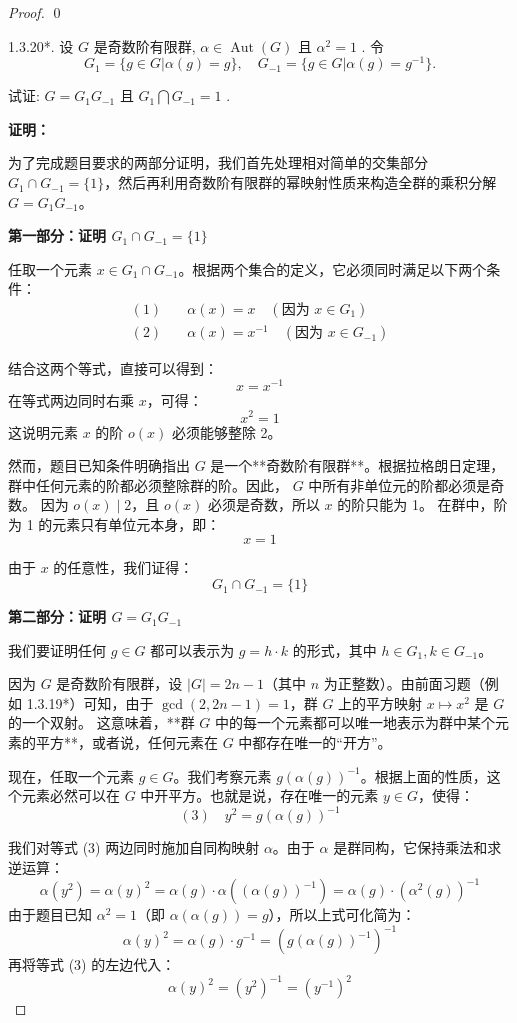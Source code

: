 \documentclass[]{article}
\begin{document}
\begin{proof}
\qed

1.3.20*. 设 $G$ 是奇数阶有限群, $\alpha \in \operatorname{Aut}(G)$ 且 $\alpha^2 = 1$ . 令 	$$
G _ {1} = \{g \in G | \alpha (g) = g \}, \quad G _ {- 1} = \{g \in G | \alpha (g) = g ^ {- 1} \}.
$$

试证: $G = G_{1}G_{-1}$ 且 $G_{1} \bigcap G_{-1} = 1$ . 

\bigskip
\noindent \textbf{证明：} 

为了完成题目要求的两部分证明，我们首先处理相对简单的交集部分 $G_{1} \cap  G_{-1} = \{1\}$，然后再利用奇数阶有限群的幂映射性质来构造全群的乘积分解 $G = G_{1}G_{-1}$。

\bigskip
\noindent \textbf{第一部分：证明 $G_{1} \cap  G_{-1} = \{1\}$}

任取一个元素 $x \in G_{1} \cap  G_{-1}$。根据两个集合的定义，它必须同时满足以下两个条件：
\begin{align*}
	(1) \quad & \alpha(x) = x \quad (\text{因为 } x \in G_1) \\
	(2) \quad & \alpha(x) = x^{-1} \quad (\text{因为 } x \in G_{-1})
\end{align*}

结合这两个等式，直接可以得到：
\[ x = x^{-1} \]
在等式两边同时右乘 $x$，可得：
\[ x^2 = 1 \]
这说明元素 $x$ 的阶 $o(x)$ 必须能够整除 2。

然而，题目已知条件明确指出 $G$ 是一个**奇数阶有限群**。根据拉格朗日定理，群中任何元素的阶都必须整除群的阶。因此， $G$ 中所有非单位元的阶都必须是奇数。
因为 $o(x) \mid 2$，且 $o(x)$ 必须是奇数，所以 $x$ 的阶只能为 1。
在群中，阶为 1 的元素只有单位元本身，即：
\[ x = 1 \]

由于 $x$ 的任意性，我们证得：
\[ G_{1} \cap  G_{-1} = \{1\} \]

\bigskip
\noindent \textbf{第二部分：证明 $G = G_{1}G_{-1}$}

我们要证明任何 $g \in G$ 都可以表示为 $g = h \cdot k$ 的形式，其中 $h \in G_1, k \in G_{-1}$。

因为 $G$ 是奇数阶有限群，设 $|G| = 2n-1$（其中 $n$ 为正整数）。由前面习题（例如 1.3.19*）可知，由于 $\gcd(2, 2n-1) = 1$，群 $G$ 上的平方映射 $x \mapsto x^2$ 是 $G$ 的一个双射。
这意味着，**群 $G$ 中的每一个元素都可以唯一地表示为群中某个元素的平方**，或者说，任何元素在 $G$ 中都存在唯一的“开方”。

现在，任取一个元素 $g \in G$。我们考察元素 $g (\alpha(g))^{-1}$。根据上面的性质，这个元素必然可以在 $G$ 中开平方。也就是说，存在唯一的元素 $y \in G$，使得：
\[ (3) \quad y^2 = g (\alpha(g))^{-1} \]

我们对等式 (3) 两边同时施加自同构映射 $\alpha$。由于 $\alpha$ 是群同构，它保持乘法和求逆运算：
\[ \alpha(y^2) = \alpha(y)^2 = \alpha(g) \cdot \alpha((\alpha(g))^{-1}) = \alpha(g) \cdot (\alpha^2(g))^{-1} \]
由于题目已知 $\alpha^2 = 1$（即 $\alpha(\alpha(g)) = g$），所以上式可化简为：
\[ \alpha(y)^2 = \alpha(g) \cdot g^{-1} = (g (\alpha(g))^{-1})^{-1} \]
再将等式 (3) 的左边代入：
\[ \alpha(y)^2 = (y^2)^{-1} = (y^{-1})^2 \]


\end{proof}
\end{document}
